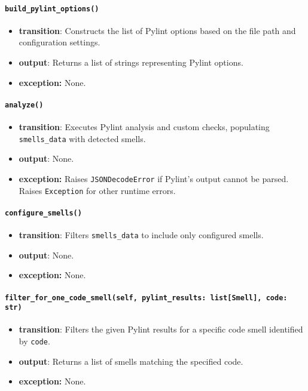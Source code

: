 \documentclass[12pt, titlepage]{article}
\begin{document}
\paragraph{\texttt{build\_pylint\_options()}}
\begin{itemize}
  \item \textbf{transition}: Constructs the list of Pylint options based on the file path and configuration settings.
  \item \textbf{output}: Returns a list of strings representing Pylint options.
  \item \textbf{exception:} None.
\end{itemize}

\paragraph{\texttt{analyze()}}
\begin{itemize}
  \item \textbf{transition}: Executes Pylint analysis and custom checks, populating \texttt{smells\_data} with detected smells.
  \item \textbf{output}: None.
  \item \textbf{exception:} Raises \texttt{JSONDecodeError} if Pylint's output cannot be parsed. Raises \texttt{Exception} for other runtime errors.
\end{itemize}

\paragraph{\texttt{configure\_smells()}}
\begin{itemize}
  \item \textbf{transition}: Filters \texttt{smells\_data} to include only configured smells.
  \item \textbf{output}: None.
  \item \textbf{exception:} None.
\end{itemize}

\paragraph{\texttt{filter\_for\_one\_code\_smell(self, pylint\_results: list[Smell], code: str)}}
\begin{itemize}
  \item \textbf{transition}: Filters the given Pylint results for a specific code smell identified by \texttt{code}.
  \item \textbf{output}: Returns a list of smells matching the specified code.
  \item \textbf{exception:} None.
\end{itemize}
\end{document}
